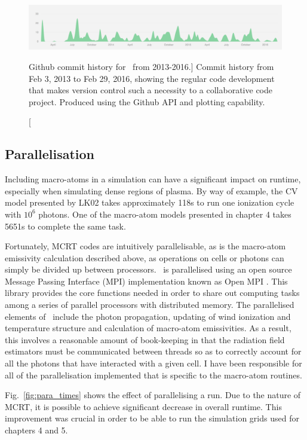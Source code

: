\begin{figure}
\centering
\includegraphics[width=1.0\textwidth]{figures/03-radtrans/github1.png}
\caption
[Github commit history for \py\ from 2013-2016.]
{
Commit history from Feb 3, 2013 to Feb 29, 2016, showing the regular code development
that makes version control such a necessity to a collaborative code project. Produced
using the Github API and plotting capability.
} 
\label{fig:github}
\end{figure}

\subsection{Parallelisation} 
\label{sec:parallel}

Including macro-atoms in a simulation can have a significant impact 
on runtime, especially when simulating dense regions of plasma. 
By way of example, the CV model presented by LK02 takes approximately
118s to run one ionization cycle with $10^6$ photons. One of the macro-atom 
models presented in chapter 4 takes 5651s to complete the same task. 

Fortunately, MCRT codes are intuitively parallelisable, as is the macro-atom
emissivity calculation described above, as operations on cells or photons can
simply be divided up between processors. \py\ is parallelised using an open 
source Message Passing Interface (MPI) implementation known as 
Open MPI \citep{openmpi}. This library provides the core functions needed
in order to share out computing tasks among a series of parallel processors
with distributed memory. The parallelised elements of \py\ include
the photon propagation, updating of wind ionization and temperature structure
and calculation of macro-atom emissivities. As a result, this involves
a reasonable amount of book-keeping in that the radiation field estimators 
must be communicated between threads so as to correctly account for all
the photons that have interacted with a given cell. I have been responsible
for all of the parallelisation implemented that is
specific to the macro-atom routines.

Fig.~\ref{fig:para_times} shows the effect of parallelising a run. Due to the nature of MCRT,
it is possible to achieve significant decrease in overall 
runtime. This improvement was crucial in order to be able to run the simulation
grids used for chapters 4 and 5.


